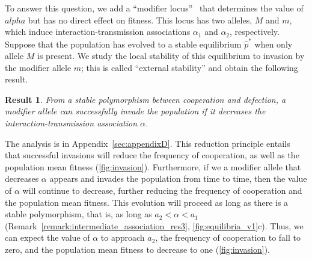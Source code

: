 \documentclass[12pt]{extarticle}
\newtheorem{result}{Result}
\begin{document}
To answer this question, we add a ``modifier locus''~\citep{Feldman1972,Liberman1986general,Liberman1986modifiers,Liberman1988} that determines the value of $alpha$ but has no direct effect on fitness.
This locus has two alleles, $M$ and $m$, which induce interaction-transmission associations $\alpha_1$ and $\alpha_2$, respectively.
Suppose that the population has evolved to a stable equilibrium $\hat{p}^*$  when only allele $M$ is present.
We study the local stability of this equilibrium to invasion by the modifier allele $m$; this is called ``external stability'' \citep{Liberman1986modifiers,Altenberg2017} and obtain the following result.
\\


\begin{result}%
\label{result:evol_social_association}
From a stable polymorphism between cooperation and defection, a modifier allele can successfully invade the population if it decreases the interaction-transmission association $\alpha$.
\end{result}

The analysis is in Appendix~\ref{sec:appendixD}.
This reduction principle entails that successful invasions will reduce the frequency of cooperation, as well as the population mean fitness (\autoref{fig:invasion}).
Furthermore, if we a modifier allele that decreases $\alpha$ appears and invades the population from time to time, then the value of $\alpha$ will continue to decrease, further reducing the frequency of cooperation and the population mean fitness.
This evolution will proceed as long as there is a stable polymorphism, that is, as long as $a_2 < \alpha < a_1$ (Remark~\ref{remark:intermediate_association_res3}, \autoref{fig:equilibria_v1}c). 
Thus, we can expect the value of $\alpha$ to approach $a_2$, the frequency of cooperation to fall to zero, and the population mean fitness to decrease to one (\autoref{fig:invasion}).


\end{document}

